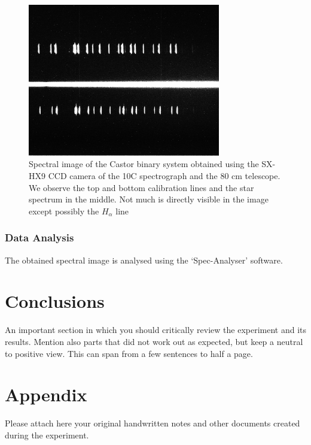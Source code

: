 \documentclass[12pt,a4paper]{article}
\begin{document}
      \begin{figure}[H]
        \centering
        \includegraphics[width=0.75\textwidth]{Pictures/spectrum_image.png}
        \caption{Spectral image of the Castor binary system obtained using the SX-HX9 CCD camera of the 10C spectrograph and the 80 cm telescope. 
        We observe the top and bottom calibration lines and the star spectrum in the middle. Not much is directly visible in the image except possibly the $H_\alpha$ line}
        \label{spectrum_img} 
      \end{figure}
    \subsubsection{Data Analysis}
      The obtained spectral image is analysed using the `Spec-Analyser' software. 
\section{Conclusions}
An important section in which you should critically review the experiment and its results. Mention also parts that did not work out as expected, but keep a neutral to positive view. This can span from a few sentences to half a page.

\setcounter{secnumdepth}{0}

\printbibliography
\appendix
\section{Appendix}

Please attach here your original handwritten notes and other documents created during the experiment.
\end{document}
